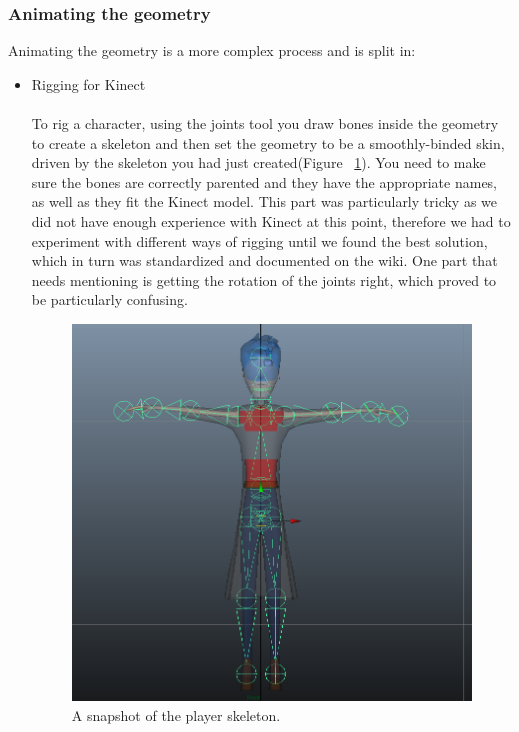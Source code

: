 \documentclass[a4paper,oneside]{memoir}
\begin{document}
        \subsubsection{Animating the geometry}
            
            Animating the geometry is a more complex process and is split in:
                
                \begin{itemize}
                    \item Rigging for Kinect \\\\
                    	To rig a character, using the joints tool you draw bones inside the geometry to create a skeleton and then set the geometry to be a smoothly-binded skin, driven by the skeleton you had just created(Figure ~\ref{fig:A snapshot of the player skeleton.}). You need to make sure the bones are correctly parented and they have the appropriate names, as well as they fit the Kinect model. This part was particularly tricky as we did not have enough experience with Kinect at this point, therefore we had to experiment with different ways of rigging until we found the best solution, which in turn was standardized and documented on the wiki. One part that needs mentioning is getting the rotation of the joints right, which proved to be particularly confusing.

                    \begin{figure}[ht]
						\begin{center}
							\includegraphics[width=120mm]{"../Screenshots/Maya/charrigging"}
							\caption{A snapshot of the player skeleton.}
							\label{fig:A snapshot of the player skeleton.}
						\end{center}
					\end{figure}


\end{itemize}
\end{document}
